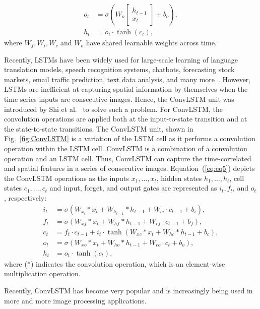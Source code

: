 \begin{sloppypar}
	\begin{equation}
		\begin{aligned}
			o_{t} &=\sigma\left(W_{o} 
			\left[
			\begin{array}{c}
				h_{t-1} \\ x_{t}
			\end{array} 
			\right]
			+b_{o}\right), \\
			h_{t} &=o_{t} \cdot \tanh \left(c_{t}\right),
		\end{aligned}
		\label{eq:eq4}
	\end{equation} 
	where \(W_{f}, W_{i}, W_{c}\) and \(W_{o}\) have shared learnable weights across time.
	
	Recently, LSTMs have been widely used for large-scale learning of language 
	translation models, speech recognition systems, chatbots, forecasting stock 
	markets, email traffic prediction, text data analysis, and many 
	more~\cite{graves2014towards, cho2014properties, om2020modelling}. 
	However, LSTMs are inefficient at capturing spatial information by themselves when the time series inputs are consecutive images.
	Hence, the ConvLSTM unit was introduced by Shi et al.~\cite{xingjian2015convolutional} to solve such a problem.
	For ConvLSTM, the convolution operations are applied both at the input-to-state transition and at the state-to-state transitions.  
	The ConvLSTM unit, shown in Fig.~\ref{fig:ConvLSTM} is a variation of the LSTM cell as it performs a convolution operation within the LSTM cell.
	ConvLSTM is a combination of a convolution operation and an LSTM cell.
	Thus, ConvLSTM can capture the time-correlated and spatial features in a series of consecutive images.
	Equation~(\ref{eq:eq5}) depicts the ConvLSTM operations as the inputs \(x_1, \dots, x_t\), hidden states \(h_1, \dots, h_t\), cell states \(c_1, \dots, c_t\) and input, forget, and output gates are represented as \(i_t, f_t\), and \(o_t\), respectively:
	\begin{equation}
		\begin{aligned}
			i_{t} &=\sigma\left(W_{x_t} * x_{t}+W_{h_{t-1}} * h_{t-1}+W_{c i} \cdot c_{t-1}+b_{i}\right),
			\\
			f_{t} &=\sigma\left(W_{x f} * x_{t}+W_{h f} * h_{t-1}+W_{c f} \cdot c_{t-1}+b_{f}\right), \\
			c_{t} &=f_{t} \cdot c_{t-1}+i_{t} \cdot \tanh \left(W_{x c} * x_{t}+W_{h c} * h_{t-1}+b_{c}\right), 
			\\
			o_{t} &=\sigma\left(W_{x o} * x_{t}+W_{h o} * h_{t-1}+W_{c o} \cdot c_{t}+b_{o}\right), \\
			h_{t} &=o_{t} \cdot \tanh \left(c_{t}\right),
		\end{aligned}
		\label{eq:eq5}
	\end{equation}
	where (\(*\)) indicates the convolution operation, which is an element-wise multiplication operation.
	
	Recently, ConvLSTM has become very popular and is increasingly being used in 
	more and more image processing applications.
\end{sloppypar}
